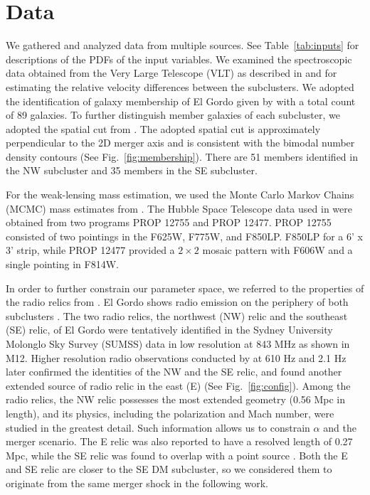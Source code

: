 \section{Data} 
We gathered and analyzed data from multiple sources. 
See Table~\ref{tab:inputs} for descriptions of the PDFs of the input
variables. 
We examined the
spectroscopic data obtained from the Very Large Telescope (VLT) as described in  and \citet{Sifon13} for estimating the
relative velocity differences between the subclusters.
We adopted the identification of galaxy membership of El Gordo given by
\citet{Sifon13} with a total count of 89 galaxies.
To further distinguish member galaxies of each subcluster, we adopted the
spatial cut from .
The adopted spatial cut is approximately perpendicular to the 2D merger
axis  and is consistent with
the bimodal number density contours (See Fig.~\ref{fig:membership}). 
There are 51 members identified in the NW subcluster and 35 members in the SE
subcluster. \par 
For the weak-lensing mass estimation, we used the
Monte Carlo Markov Chains (MCMC) mass estimates from .
The Hubble Space Telescope data used in  were obtained from two
programs PROP 12755 and PROP 12477. PROP 12755 consisted of two pointings in the F625W, F775W, and F850LP.
F850LP for a 6' x 3' strip, while PROP 12477 provided a $2 \times 2$ mosaic
pattern with F606W and a single pointing in F814W. 
\par 
In order to further constrain our parameter space, we referred to the properties of
the radio relics from \citet{L13}. El Gordo shows radio emission on the
periphery of both subclusters . The two radio relics, the
northwest (NW) relic and the southeast (SE) relic, of El Gordo were
tentatively identified
in the Sydney University Molonglo Sky Survey (SUMSS) data in low
resolution at 843 MHz \citep{Mauch03} as shown in M12. Higher
resolution radio observations conducted by \cite{L13} at 610 \mega Hz and
2.1 \giga Hz later confirmed the identities of the NW and the SE relic, and
found another extended source of radio relic in the east (E) (See Fig.~\ref{fig:config}). Among the radio relics, the NW relic possesses the most extended geometry
(0.56 Mpc in length), and its physics, including the
polarization and Mach number, were studied in the greatest detail. Such
information allows us to constrain $\alpha$ and the merger scenario. The E relic
was also reported to have a resolved length of 0.27 Mpc, while the SE relic
was found to overlap with a point source \citep{L13}. Both the E and SE
relic are closer to the SE DM subcluster, so we considered them to
originate from the same merger shock in the following work.
